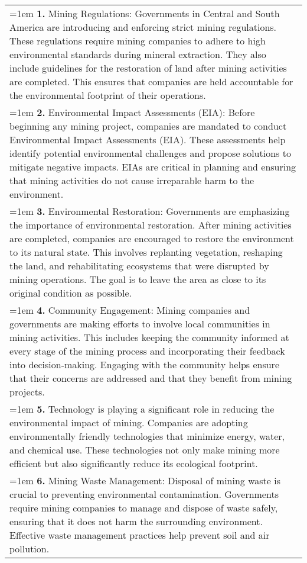 \begin{table*}[htbp]
{\begin{tabular}{p{15cm}}
 \\ 
   \hangindent=1em \hangafter=1 \textbf{1.} Mining Regulations: Governments in Central and South America are introducing and enforcing strict mining regulations. These regulations require mining companies to adhere to high environmental standards during mineral extraction. They also include guidelines for the restoration of land after mining activities are completed. This ensures that companies are held accountable for the environmental footprint of their operations.
 \\
  \hangindent=1em \hangafter=1 \textbf{2.} Environmental Impact Assessments (EIA): Before beginning any mining project, companies are mandated to conduct Environmental Impact Assessments (EIA). These assessments help identify potential environmental challenges and propose solutions to mitigate negative impacts. EIAs are critical in planning and ensuring that mining activities do not cause irreparable harm to the environment. \\ 
  \hangindent=1em \hangafter=1 \textbf{3.} Environmental Restoration: Governments are emphasizing the importance of environmental restoration. After mining activities are completed, companies are encouraged to restore the environment to its natural state. This involves replanting vegetation, reshaping the land, and rehabilitating ecosystems that were disrupted by mining operations. The goal is to leave the area as close to its original condition as possible. \\
   \hangindent=1em \hangafter=1 \textbf{4.} Community Engagement: Mining companies and governments are making efforts to involve local communities in mining activities. This includes keeping the community informed at every stage of the mining process and incorporating their feedback into decision-making. Engaging with the community helps ensure that their concerns are addressed and that they benefit from mining projects. \\ 
  \hangindent=1em \hangafter=1 \textbf{5.} Technology is playing a significant role in reducing the environmental impact of mining. Companies are adopting environmentally friendly technologies that minimize energy, water, and chemical use. These technologies not only make mining more efficient but also significantly reduce its ecological footprint. \\
  \hangindent=1em \hangafter=1 \textbf{6.} Mining Waste Management: Disposal of mining waste is crucial to preventing environmental contamination. Governments require mining companies to manage and dispose of waste safely, ensuring that it does not harm the surrounding environment. Effective waste management practices help prevent soil and air pollution. \\

\end{tabular}}
\end{table*}
